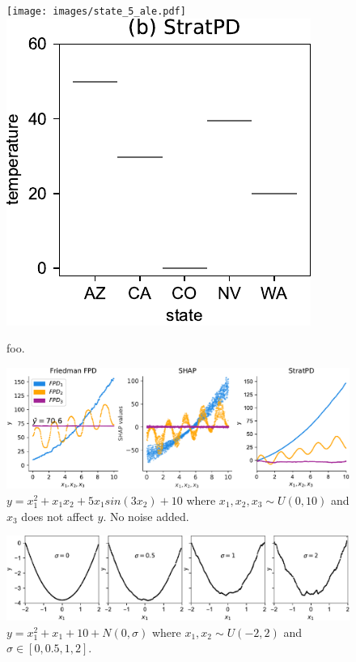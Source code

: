 \documentclass{article}
\begin{document}
\begin{figure}[htbp]
\begin{center}
\texttt{[image: images/state\_5\_ale.pdf]}~~
\includegraphics[scale=0.4]{images/state_vs_temp_stratpd.pdf}~~
\caption{\small foo.}
\label{fig:statetemp}
\end{center}
\end{figure}

\begin{figure}[htbp]
\begin{center}
\includegraphics[scale=0.4]{images/interactions.pdf}
\caption{\small $y = x_1^2 + x_1 x_2 + 5 x_1 sin(3 x_2) + 10$ where $x_1,x_2,x_3 \sim U(0,10)$ and $x_3$ does not affect $y$. No noise added.}
\label{fig:interactions}
\end{center}
\end{figure}

\begin{figure}[htbp]
\begin{center}
\includegraphics[scale=0.4]{images/noise.pdf}
\caption{\small $y = x_1^2 + x_1 + 10 + N(0,\sigma)$ where $x_1,x_2 \sim U(-2,2)$ and $\sigma \in [0,0.5,1,2]$.}
\label{fig:noise}
\end{center}
\end{figure}
\end{document}
